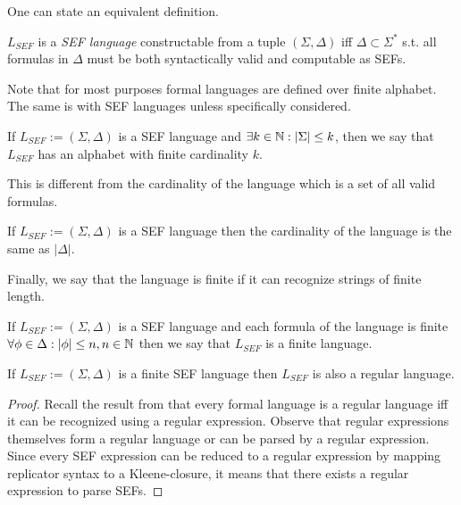 One can state an equivalent definition.

\begin{definition}$L_{SEF}$ is a \textit{SEF language} constructable from a tuple $(\Sigma, \Delta)$ iff $\Delta \subset \Sigma^*$ s.t. all formulas in $\Delta$ must be both syntactically valid and computable as SEFs.\end{definition}

Note that for most purposes formal languages are defined over finite alphabet. The same is with SEF languages unless specifically considered.

\begin{definition}If $L_{SEF} := (\Sigma, \Delta)$ is a SEF language and $\exists k \in \mathbb{N}: |\Sigma| \leq k$, then we say that $L_{SEF}$ has an alphabet with finite cardinality $k$.\end{definition}

This is different from the cardinality of the language which is a set of all valid formulas.

\begin{definition}If $L_{SEF} := (\Sigma, \Delta)$ is a SEF language then the cardinality of the language is the same as $|\Delta|$.\end{definition}

Finally, we say that the language is finite if it can recognize strings of finite length.

\begin{definition}If $L_{SEF} := (\Sigma, \Delta)$ is a SEF language and each formula of the language is finite $\forall \phi \in \Delta: |\phi| \leq n, n \in \mathbb{N}$ then we say that $L_{SEF}$ is a finite language.\end{definition}

\begin{theorem}
  If $L_{SEF} := (\Sigma, \Delta)$ is a finite SEF language then $L_{SEF}$ is also a regular language.
\end{theorem}
\begin{proof}
  Recall the result from \cite{Sipser05introcompther} that every formal language is a regular language iff it can be recognized using a regular expression. Observe that regular expressions themselves form a regular language or can be parsed by a regular expression. Since every SEF expression can be reduced to a regular expression by mapping replicator syntax to a Kleene-closure, it means that there exists a regular expression to parse SEFs.
\end{proof}


